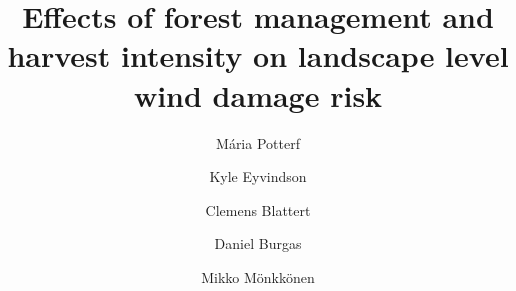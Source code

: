\documentclass[]{elsarticle} %
\begin{document}
\begin{frontmatter}

  \title{Effects of forest management and harvest intensity on landscape level
wind damage risk}
    \author[Department of Biological and Environmental Science]{Mária Potterf}
    \author[Department of Biological and Environmental Science]{Kyle Eyvindson}
    \author[Department of Biological and Environmental Science]{Clemens Blattert}
    \author[Department of Biological and Environmental Science]{Daniel Burgas}
    \author[Department of Biological and Environmental Science]{Mikko Mönkkönen}
      \address[University of Jyvaskyla]{Department of Biological and Environmental Science, University of
Jyvaskyla, P.O. Box 35, FI-40014 Jyvaskyla, Finland}
    \address[Wisdom]{This is wisdom address}
    \address[LUKE]{THIS is Luke address Department, Street, City, State, Zip}
    \cortext[]{}
  

\end{frontmatter}
\end{document}
